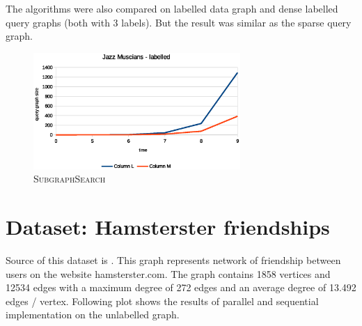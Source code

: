 The algorithms were also compared on labelled data graph and dense labelled query graphs (both with 3 labels). But the result was similar as the sparse query graph.

\begin{figure}[]
\begin{center}
        \centering
        \includegraphics[width=0.7\textwidth]{images/jazz_unlabelled_dense.eps}
        \caption{\textsc{SubgraphSearch}}
        \label{fig:flowchart}
\end{center}
\end{figure}

\section{Dataset: Hamsterster friendships}

Source of this dataset is \cite{hasmtersert}. This graph represents network of friendship between users on the website hamsterster.com. The graph contains 1858 vertices and 12534 edges with a maximum degree of 272 edges and an average degree of 13.492 edges / vertex. Following plot shows the results of parallel and sequential implementation on the unlabelled graph.

